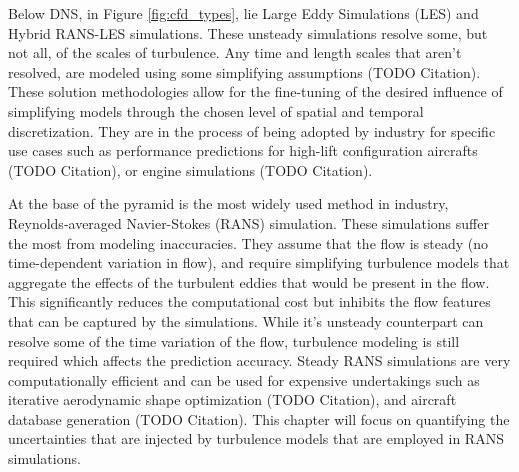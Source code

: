 Below DNS, in Figure \ref{fig:cfd_types}, lie Large Eddy Simulations (LES) and Hybrid RANS-LES simulations. These unsteady simulations resolve some, but not all, of the scales of turbulence. Any time and length scales that aren't resolved, are modeled using some simplifying assumptions (TODO Citation). These solution methodologies allow for the fine-tuning of the desired influence of simplifying models through the chosen level of spatial and temporal discretization. They are in the process of being adopted by industry for specific use cases such as performance predictions for high-lift configuration aircrafts (TODO Citation), or engine simulations (TODO Citation). 

At the base of the pyramid is the most widely used method in industry, Reynolds-averaged Navier-Stokes (RANS) simulation. These simulations suffer the most from modeling inaccuracies. They assume that the flow is steady (no time-dependent variation in flow), and require simplifying turbulence models that aggregate the effects of the turbulent eddies that would be present in the flow. This significantly reduces the computational cost but inhibits the flow features that can be captured by the simulations. While it's unsteady counterpart can resolve some of the time variation of the flow, turbulence modeling is still required which affects the prediction accuracy. Steady RANS simulations are very computationally efficient and can be used for expensive undertakings such as iterative aerodynamic shape optimization (TODO Citation), and aircraft database generation (TODO Citation). This chapter will focus on quantifying the uncertainties that are injected by turbulence models that are employed in RANS simulations. 